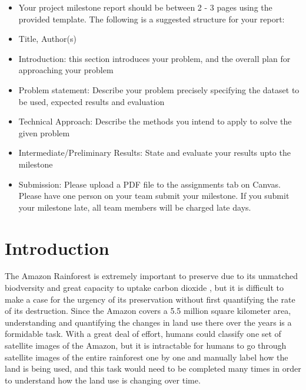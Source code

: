 \documentclass[10pt,twocolumn,letterpaper]{article}
\begin{document}
\begin{itemize}
\item Your project milestone report should be between 2 - 3 pages using the provided template. The following is a suggested structure for your report:\newline
\item Title, Author(s)\newline
\item Introduction: this section introduces your problem, and the overall plan for approaching your problem\newline
\item Problem statement: Describe your problem precisely specifying the dataset to be used, expected results and evaluation\newline
\item Technical Approach: Describe the methods you intend to apply to solve the given problem\newline
\item Intermediate/Preliminary Results: State and evaluate your results upto the milestone
\item Submission: Please upload a PDF file to the assignments tab on Canvas. Please have one person on your team submit your milestone. If you submit your milestone late, all team members will be charged late days.
\end{itemize}

\fi

\section{Introduction}

	The Amazon Rainforest is extremely important to preserve due to its unmatched biodversity and great capacity to uptake carbon dioxide \cite{WWF}, but it is difficult to make a case for the urgency of its preservation without first quantifying the rate of its destruction.  Since the Amazon covers a 5.5 million square kilometer area, understanding and quantifying the changes in land use there over the years is a formidable task. With a great deal of effort, humans could classify one set of satellite images of the Amazon, but it is intractable for humans to go through satellite images of the entire rainforest one by one and manually label how the land is being used, and this task would need to be completed many times in order to understand how the land use is changing over time.
\end{document}
